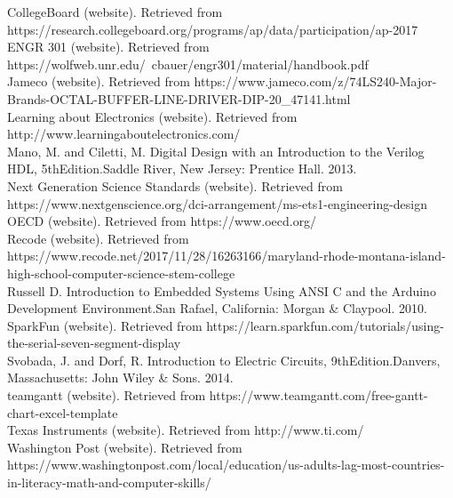 \documentclass[12pt, letterpaper]{report}
\begin{document}
CollegeBoard (website). Retrieved from https://research.collegeboard.org/programs/ap/data/participation/ap-2017 \\

ENGR 301 (website). Retrieved from https://wolfweb.unr.edu/~cbauer/engr301/material/handbook.pdf \\

Jameco (website). Retrieved from https://www.jameco.com/z/74LS240-Major-Brands-OCTAL-BUFFER-LINE-DRIVER-DIP-20\_47141.html \\

Learning about Electronics (website). Retrieved from http://www.learningaboutelectronics.com/ \\

Mano, M. and Ciletti, M. Digital Design with an Introduction to the Verilog HDL, 5thEdition.Saddle River, New Jersey: Prentice Hall. 2013. \\

Next Generation Science Standards (website). Retrieved from https://www.nextgenscience.org/dci-arrangement/ms-ets1-engineering-design \\

OECD (website). Retrieved from https://www.oecd.org/  \\

Recode (website). Retrieved from https://www.recode.net/2017/11/28/16263166/maryland-rhode-montana-island-high-school-computer-science-stem-college \\

Russell D. Introduction to Embedded Systems Using ANSI C and the Arduino Development Environment.San Rafael, California: Morgan & Claypool. 2010. \\ 

SparkFun (website). Retrieved from https://learn.sparkfun.com/tutorials/using-the-serial-seven-segment-display \\

Svobada, J. and Dorf, R. Introduction to Electric Circuits, 9thEdition.Danvers, Massachusetts: John Wiley & Sons. 2014. \\

teamgantt (website). Retrieved from https://www.teamgantt.com/free-gantt-chart-excel-template \\

Texas Instruments (website). Retrieved from http://www.ti.com/ \\

Washington Post (website). Retrieved from https://www.washingtonpost.com/local/education/us-adults-lag-most-countries-in-literacy-math-and-computer-skills/
\end{document}
